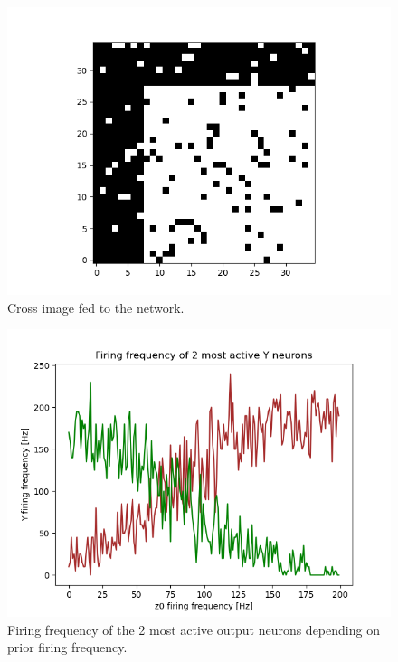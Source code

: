 \begin{figure}
  \includegraphics[width=\linewidth]{figures/horvertAdaptiveInh/crossImageForVariablePrior.png}
  \caption{ Cross image fed to the network. }
  \label{fig:horvertAdaptiveInhibitionVariablePriorValImage}
\end{figure}

\begin{figure}
  \includegraphics[width=\linewidth]{figures/horvertAdaptiveInh/YFrequency_prior199.png}
  \caption{ Firing frequency of the 2 most active output neurons depending on prior firing frequency. }
  \label{fig:horvertAdaptiveInhibitionVariablePriorValFrequency}
\end{figure}

